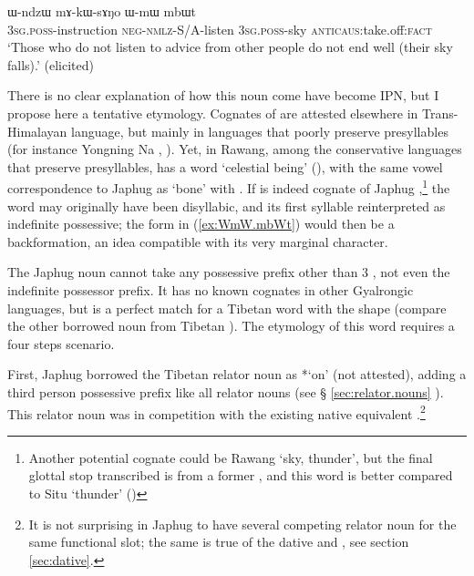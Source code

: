 \begin{exe}
\ex  \label{ex:WmW.mbWt}
\gll  ɯ-ndzɯ mɤ-kɯ-sɤŋo ɯ-mɯ mbɯt  \\
\textsc{3sg.poss}-instruction \textsc{neg}-\textsc{nmlz}-S/A-listen \textsc{3sg.poss}-sky \textsc{anticaus}:take.off:\textsc{fact} \\
\glt `Those who do not listen to advice from other people do not end well (their sky falls).' (elicited)
\end{exe}
There is no clear explanation of how this noun come have become IPN, but I propose here a tentative etymology. Cognates of  are attested elsewhere in Trans-Himalayan language, but mainly in languages that poorly preserve presyllables (for instance Yongning Na , \citealt[132]{michaud17yongning}). Yet, in Rawang, among the conservative languages that preserve presyllables, has a word   `celestial being'  (\citealt[13]{lapolla01rawang}), with the same vowel correspondence to Japhug  as   `bone' with . If   is indeed cognate of Japhug ,\footnote{Another potential cognate could be Rawang   `sky, thunder', but the final glottal stop transcribed  is from a former , and this word is better compared to Situ  `thunder' (\citealt[73]{zhang16bragdbar})} the word may originally have been disyllabic, and its first syllable reinterpreted as indefinite possessive; the form  in (\ref{ex:WmW.mbWt}) would then be a backformation, an idea compatible with its very marginal character.

 
The Japhug noun  cannot take any possessive prefix other than 3\sg{} , not even the indefinite possessor prefix. It has no known cognates in other Gyalrongic languages, but is a perfect match for a Tibetan word with the shape  (compare the other borrowed noun  from Tibetan ). The etymology of this word requires a four steps scenario.

First, Japhug borrowed the Tibetan relator noun   as  *`on' (not attested), adding a third person possessive prefix like all relator nouns (see § \ref{sec:relator.nouns} ). This relator noun was in competition with the existing native equivalent .\footnote{It is not surprising in Japhug to have several competing relator noun for the same functional slot; the same is true of the dative  and , see section \ref{sec:dative}. }
  
